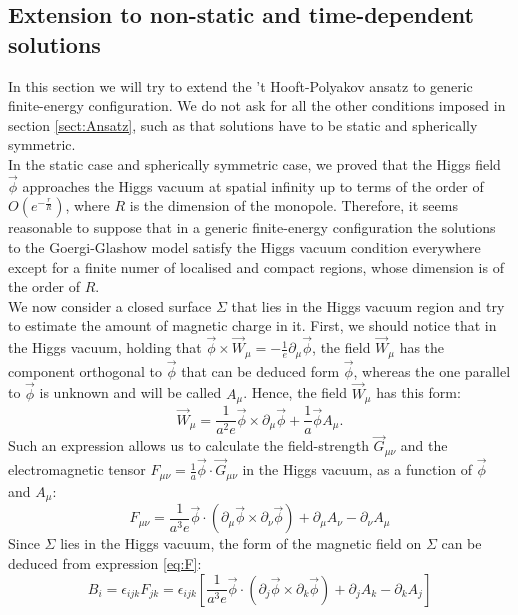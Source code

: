 \subsection{Extension to non-static and time-dependent solutions}
\label{sect:top}
In this section we will try to extend the 't Hooft-Polyakov ansatz to generic finite-energy configuration. We do not ask for all the other conditions imposed in section \ref{sect:Ansatz}, such as that solutions have to be static and spherically symmetric. \\
In the static case and spherically symmetric case, we proved that the Higgs field $\vec{\phi}$ approaches the Higgs vacuum at spatial infinity up to terms of the order of $O(e^{-\frac{r}{R}})$, where $R$ is the dimension of the monopole.
Therefore, it seems reasonable to suppose that in a generic finite-energy configuration the solutions to the Goergi-Glashow model satisfy the Higgs vacuum condition everywhere except for a finite numer of localised and compact regions, whose dimension is of the order of $R$.\\
We now consider a closed surface $\Sigma$ that lies in the Higgs vacuum region and try to estimate the amount of magnetic charge in it. 
First, we should notice that in the Higgs vacuum, holding that $ \vec{\phi} \times \vec{W}_\mu = - \frac{1}{e} \partial_\mu \vec{\phi}$, the field $\vec{W}_\mu $ has the component orthogonal to $\vec{\phi}$ that can be deduced form $\vec{\phi}$, whereas the one parallel to $\vec{\phi}$ is unknown and will be called $A_\mu$. Hence, the field $\vec{W}_{\mu}$ has this form: 
\begin{equation}
\vec{W}_{\mu} = \frac{1}{a^2 e} \vec{\phi} \times \partial_\mu \vec{\phi} + \frac{1}{a}\vec{\phi} A_\mu . 
\end{equation}
Such an expression allows us to calculate the field-strength $\vec{G}_{\mu \nu}$ and the electromagnetic tensor $F_{\mu \nu} = \frac{1}{a} \vec{\phi}\cdot \vec{G}_{\mu \nu}$ in the Higgs vacuum, as a function of $\vec{\phi}$ and $A_\mu$: 
\begin{equation}
F_{\mu \nu}  = \frac{1}{a^3 e}\vec{\phi}\cdot \left(  \partial_\mu \vec{\phi}  \times  \partial_\nu \vec{\phi} \right) + \partial_\mu A_\nu -\partial_\nu A_\mu
\label{eq:F}
\end{equation}
Since $\Sigma $ lies in the Higgs vacuum, the form of the magnetic field on $\Sigma$ can be deduced from expression \ref{eq:F}:
\begin{equation}
B_i = \epsilon_{ijk} F_{jk} =   \epsilon_{ijk} \left[ \frac{1}{a^3 e} \vec{\phi}\cdot \left(  \partial_j \vec{\phi}  \times  \partial_k \vec{\phi} \right) + \partial_j A_k -\partial_k A_j \right]
\end{equation}
